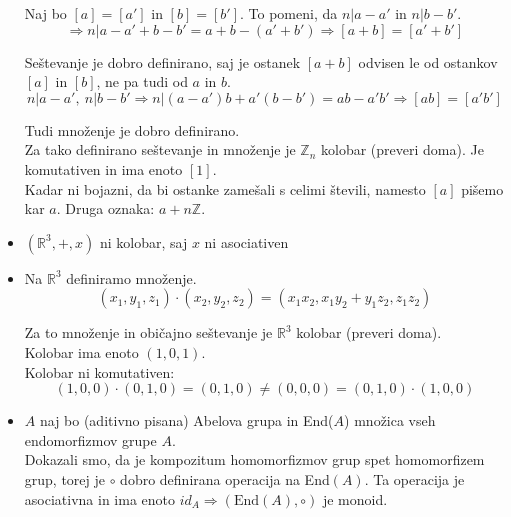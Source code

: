 \documentclass[a4paper,12pt]{article}
\begin{document}
\begin{itemize}
Naj bo $[a]=[a']$ in $[b]=[b']$. To pomeni, da $n|a-a'$ in $n|b-b'$. 
\begin{equation*}
\Rightarrow n|a-a' + b-b'=a+b-(a'+b')\Rightarrow [a+b]=[a'+b']
\end{equation*}

Seštevanje je dobro definirano, saj je ostanek $[a+b]$ odvisen le od ostankov $[a]$ in $[b]$, ne pa tudi od $a$ in $b$. 
\begin{equation*}
n|a-a',~n|b-b' \Rightarrow n|(a-a')b+a'(b-b')=ab-a'b' \Rightarrow [ab]=[a'b']
\end{equation*}

Tudi množenje je dobro definirano. \\

Za tako definirano seštevanje in množenje je $\mathbb{Z}_n$ kolobar (preveri doma). Je komutativen in ima enoto $[1]$.\\

Kadar ni bojazni, da bi ostanke zamešali s celimi števili, namesto $[a]$ pišemo kar $a$. Druga oznaka: $a+n\mathbb{Z}$.

\item $(\mathbb{R}^3,+,x)$ ni kolobar, saj $x$ ni asociativen

\item Na $\mathbb{R}^3$ definiramo množenje. \\
\begin{equation*}
(x_1,y_1,z_1)\cdot (x_2,y_2,z_2)=(x_1x_2,x_1y_2+y_1z_2,z_1z_2)
\end{equation*}

Za to množenje in običajno seštevanje je $\mathbb{R}^3$ kolobar (preveri doma). \\

Kolobar ima enoto $(1,0,1)$. \\

Kolobar ni komutativen: 
\begin{equation*}
(1,0,0)\cdot(0,1,0)=(0,1,0) \neq (0,0,0) = (0,1,0)\cdot (1,0,0)
\end{equation*}

\item $A$ naj bo (aditivno pisana) Abelova grupa in End($A$) množica vseh endomorfizmov grupe $A$. \\

Dokazali smo, da je kompozitum homomorfizmov grup spet homomorfizem grup, torej je $\circ$ dobro definirana operacija na End$(A)$. Ta operacija je asociativna in ima enoto $id_A \Rightarrow (\text{End}(A),\circ)$ je monoid.\\
\end{itemize}
\end{document}
